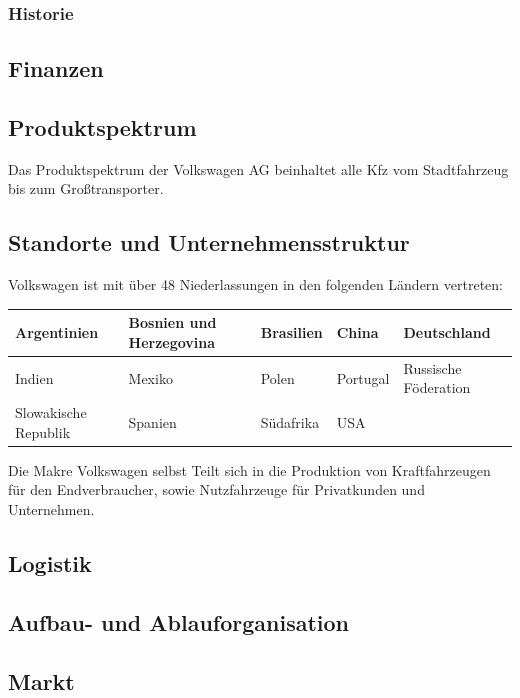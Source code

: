 \documentclass[12pt]{article}
\begin{document}
\subsubsection{Historie}

\subsection{Finanzen}
\subsection{Produktspektrum}
Das Produktspektrum der Volkswagen AG beinhaltet alle Kfz vom Stadtfahrzeug bis zum Großtransporter.

\subsection{Standorte und Unternehmensstruktur}
Volkswagen ist mit über 48 Niederlassungen in den folgenden Ländern vertreten:

\begin{table}[h]
	\begin{tabular}{|l|l|l|l|l|}
		\hline
		Argentinien          & Bosnien und Herzegovina & Brasilien & China    & Deutschland          \\ \hline
		Indien               & Mexiko                  & Polen     & Portugal & Russische Föderation \\ \hline
		Slowakische Republik & Spanien                 & Südafrika & USA      &                      \\ \hline
	\end{tabular}
\end{table}

Die Makre Volkswagen selbst Teilt sich in die Produktion von Kraftfahrzeugen für den Endverbraucher, sowie Nutzfahrzeuge für Privatkunden und Unternehmen.

\subsection{Logistik}
\subsection{Aufbau- und Ablauforganisation}
\subsection{Markt}
\end{document}
